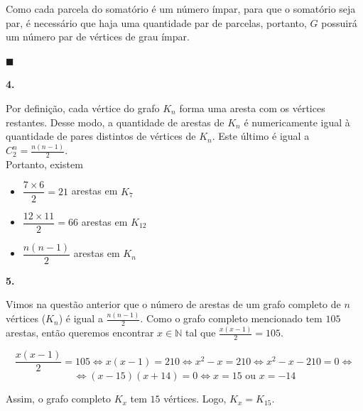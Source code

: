 \documentclass[12pt, a4paper]{article}
\begin{document}
Como cada parcela do somatório é um número ímpar, para que o somatório seja par, é necessário que haja uma quantidade par de parcelas, portanto, \(G\) possuirá um número par de vértices de grau ímpar.

\begin{flushright}
$\blacksquare$
\end{flushright}

\textbf{4.}

Por definição, cada vértice do grafo \(K_n\) forma uma aresta com os vértices restantes. Desse modo, a quantidade de arestas de \(K_n\) é numericamente igual à quantidade de pares distintos de vértices de \(K_n\). Este último é igual a \(C^n_2 = \frac{n(n-1)}{2}\). \\

Portanto, existem 
\begin{itemize}
\item \(\dfrac{7\times6}{2}=21\) arestas em \(K_7\)

\item \(\dfrac{12\times11}{2}=66\) arestas em \(K_{12}\)

\item \(\dfrac{n(n-1)}{2}\) arestas em \(K_n\)
\end{itemize}

\textbf{5.}

Vimos na questão anterior que o número de arestas de um grafo completo de \(n\) vértices (\(K_n\)) é igual a \(\frac{n(n-1)}{2}\). Como o grafo completo mencionado tem \(105\) arestas, então queremos encontrar \(x \in \mathbb{N}\) tal que \(\frac{x(x-1)}{2}=105\). 

\[\dfrac{x(x-1)}{2}=105 \Longleftrightarrow x(x-1) = 210 \Longleftrightarrow x^2 - x = 210 \Longleftrightarrow x^2 -x - 210 = 0 \Longleftrightarrow\]\[\Longleftrightarrow (x-15)(x+14) = 0
 \Longleftrightarrow x = 15 \text{ ou } x = -14\]

Assim, o grafo completo \(K_x\) tem \(15\) vértices. Logo, \(K_x = K_{15}\).

 
\end{document}
